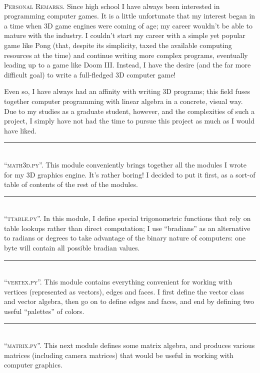 \documentclass[12pt]{article}
\newcommand{\normaltitleize}[1]{\mbox{}\\ \textsc{#1} \normalsize}
\newcommand{\sectionline}{
\begin{center}
   \rule{1in}{.01in}
\end{center}
}
\begin{document}
\normaltitleize{Personal Remarks.}  Since high school I have always been interested in programming computer games.  It is a little unfortunate that my interest began in a time when 3D game engines were coming of age; my career wouldn't be able to mature with the industry.  I couldn't start my career with a simple yet popular game like Pong (that, despite its simplicity, taxed the available computing resources at the time) and continue writing more complex programs, eventually leading up to a game like Doom III.  Instead, I have the desire (and the far more difficult goal) to write a full-fledged 3D computer game!

Even so, I have always had an affinity with writing 3D programs; this field fuses together computer programming with linear algebra in a concrete, visual way.  Due to my studies as a graduate student, however, and the complexities of such a project, I simply have not had the time to pursue this project as much as I would have liked.

\sectionline

\normaltitleize{``math3d.py''.}  This module conveniently brings together all the modules I wrote for my 3D graphics engine.  It's rather boring!  I decided to put it first, as a sort-of table of contents of the rest of the modules.




\sectionline

\normaltitleize{``ttable.py''.} In this module, I define special trigonometric functions that rely on table lookups rather than direct computation; I use ``bradians'' as an alternative to radians or degrees to take advantage of the binary nature of computers:  one byte will contain all possible bradian values.




\sectionline

\normaltitleize{``vertex.py''.} This module contains everything convenient for working with vertices (represented as vectors), edges and faces.  I first define the vector class and vector algebra, then go on to define edges and faces, and end by defining two useful ``palettes'' of colors.




\sectionline

\normaltitleize{``matrix.py''.}  This next module defines some matrix algebra, and produces various matrices (including camera matrices) that would be useful in working with computer graphics.
\end{document}
